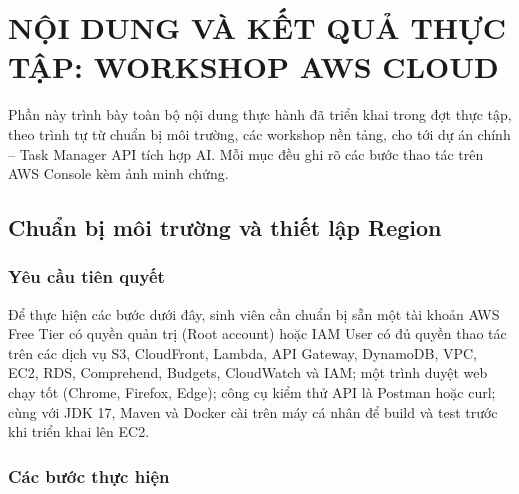\documentclass[13pt]{extarticle}
\begin{document}
\newpage

\section{NỘI DUNG VÀ KẾT QUẢ THỰC TẬP: WORKSHOP AWS CLOUD}

Phần này trình bày toàn bộ nội dung thực hành đã triển khai trong đợt thực
tập, theo trình tự từ chuẩn bị môi trường, các workshop nền tảng, cho tới
dự án chính -- Task Manager API tích hợp AI. Mỗi mục đều ghi rõ các bước
thao tác trên AWS Console kèm ảnh minh chứng.

\subsection{Chuẩn bị môi trường và thiết lập Region}

\subsubsection{Yêu cầu tiên quyết}

Để thực hiện các bước dưới đây, sinh viên cần chuẩn bị sẵn một tài khoản AWS
Free Tier có quyền quản trị (Root account) hoặc IAM User có đủ quyền thao tác
trên các dịch vụ S3, CloudFront, Lambda, API Gateway, DynamoDB, VPC, EC2, RDS,
Comprehend, Budgets, CloudWatch và IAM; một trình duyệt web chạy tốt (Chrome,
Firefox, Edge); công cụ kiểm thử API là Postman hoặc curl; cùng với JDK 17,
Maven và Docker cài trên máy cá nhân để build và test trước khi triển khai
lên EC2.

\subsubsection{Các bước thực hiện}
\end{document}
